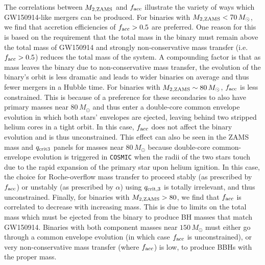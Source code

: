 \documentclass[twocolumn]{aastex631}
\begin{document}
The correlations between $M_{2,\rm{ZAMS}}$ and $f_{\rm acc}$ illustrate the variety of ways which GW150914-like mergers can be produced.
For binaries with $M_{2,\rm{ZAMS}} < 70\,M_{\odot}$, we find that accretion efficiencies of $f_{\rm acc} > 0.5$ 
are preferred. One reason for this is based on the requirement that the total mass in the binary must remain above the 
total mass of GW150914 and strongly non-conservative mass transfer (i.e. $f_{\rm acc} > 0.5$) reduces the total 
mass of the system. A compounding factor is that as mass leaves the binary due to non-conservative mass transfer, the 
evolution of the binary's orbit is less dramatic and leads to wider binaries on average and thus fewer mergers in a Hubble time.
For binaries with $M_{2,\rm{ZAMS}} \sim 80\,M_{\odot}$, $f_{\rm acc}$ is less constrained. This is because of a preference for 
these secondaries to also have primary masses near $ 80\,M_{\odot}$ and thus enter a double-core common envelope evolution in 
which both stars' envelopes are ejected, leaving behind two stripped helium cores in a tight orbit. In this case, $f_{\rm acc}$ 
does not affect the binary evolution and is thus unconstrained. This effect can also be seen in the ZAMS mass and $q_{\rm crit 3}$ 
panels for masses near $80\,M_{\odot}$ because double-core common-envelope evolution is triggered in \texttt{COSMIC} when the
radii of the two stars touch due to the rapid expansion of the primary star upon helium ignition. In this case, the choice for 
Roche-overflow mass transfer to proceed stably (as prescribed by $f_{\rm{acc}}$) or unstably (as prescribed by $\alpha$) using 
$q_{\rm crit, 3}$ is totally irrelevant, and thus unconstrained. Finally, for binaries with $M_{2,\rm{ZAMS}} > 80$, we find that 
$f_{\rm acc}$ is correlated to decrease with increasing mass. This is due to limits on the total mass which must be ejected from 
the binary to produce BH masses that match GW150914. Binaries with both component masses near $150\,M_{\odot}$ must either go 
through a common envelope evolution (in which case $f_{\rm acc}$ is unconstrained), or very non-conservative mass transfer 
(where $f_{\rm acc}$) is low, to produce BBHs with the proper mass.
\end{document}
